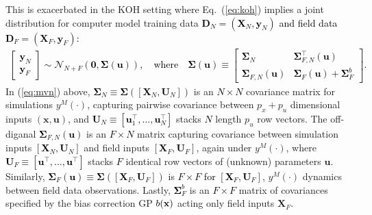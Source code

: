 \documentclass[12pt]{article}
\newcommand{\blunew}[1]{\textcolor{black}{#1}} %
\begin{document}
This is exacerbated in the KOH setting  where Eq.~(\ref{eq:koh})
implies a joint distribution for computer model training data
\blunew{
$\mathbf{D}_{N}= (\mathbf{X}_{N}, \mathbf{y}_{N})$ and field data
$\mathbf{D}_{F}= (\mathbf{X}_{F}, \mathbf{y}_{F})$:
 \begin{align}
\begin{bmatrix} \mathbf{y}_{N} \\ \mathbf{y}_{F} \end{bmatrix}
\sim \mathcal{N}_{N + F}(\mathbf{0}, \mathbf{\Sigma}(\mathbf{u})),
\quad \text{where} \quad 
\mathbf{\Sigma}(\mathbf{u}) 
\equiv \begin{bmatrix} \mathbf{\Sigma}_{N}& 
\mathbf{\Sigma}^\top_{F, N}(\mathbf{u})\\ 
\mathbf{\Sigma}_{F, N}(\mathbf{u}) &
\mathbf{\Sigma}_{F}(\mathbf{u})  + \mathbf{\Sigma}^b_{F} \end{bmatrix}.   
\label{eq:mvn}
\end{align}}
In (\ref{eq:mvn}) above,
\blunew{$\mathbf{\Sigma}_{N} \equiv \mathbf{\Sigma}([\mathbf{X}_{N},  \mathbf{U}_{N} ])$} 
is an \blunew{$N \times N$} covariance matrix for simulations $y^M(\cdot)$,
capturing pairwise covariance between 
$p_x + p_u$ dimensional inputs 
$( \mathbf{x},  \mathbf{u})$, and 
\blunew{$\mathbf{U}_{N} \equiv [ \mathbf{u}^\top_1, \dots,  \mathbf{u}^\top_{N}]$}
stacks \blunew{$N$} length $p_u$ row vectors.
The off-diganal \blunew{
$\mathbf{\Sigma}_{F, N}(\mathbf{u})$} is an \blunew{$F \times N$}
matrix capturing covariance between simulation inputs
\blunew{$[\mathbf{X}_{N},  \mathbf{U}_{N} ]$} 
and field inputs \blunew{$[\mathbf{X}_{F},  \mathbf{U}_{F}]$}, again under $y^M(\cdot)$, where
\blunew{$\mathbf{U}_{F} \equiv [ \mathbf{u}^\top, \dots,  \mathbf{u}^\top]$} 
stacks \blunew{$F$}  identical row vectors of (unknown) parameters  $\mathbf{u}$.  
Similarly, \blunew{$\mathbf{\Sigma}_{F}(\mathbf{u}) \equiv \mathbf{\Sigma}([\mathbf{X}_{F},  \mathbf{U}_{F}])$}
is \blunew{$F \times F$ for $[\mathbf{X}_{F},  \mathbf{U}_{F}]$}, 
$y^M(\cdot)$ dynamics between 
field data observations.
Lastly, \blunew{$\mathbf{\Sigma}^b_{F}$} is  an \blunew{$F \times F$}
 matrix of covariances specified by the bias correction 
GP $\blunew{b(\mathbf{x})}$ acting only field inputs $\mathbf{X}_{F}$. 
  
\end{document}

